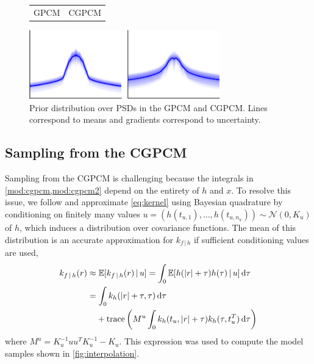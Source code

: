 \documentclass{article}
\newcommand{\id}[1]{\, \mathrm{d} #1}     %
\newcommand{\cond}{\, | \,}               %
\newcommand{\phan}[1]{\hphantom{#1\;}}
\begin{document}
\begin{figure}[t]
    \centering
    \begin{tabularx}{\linewidth}{>{\centering}X>{\centering}X}
        GPCM & CGPCM
    \end{tabularx}
    \includegraphics[width=\linewidth, height=3cm]{resources/cropped/prior_psd.pdf}
    \caption{Prior distribution over PSDs in the GPCM and CGPCM. Lines correspond to means and gradients correspond to uncertainty.}
    \label{fig:prior_psd}
\end{figure}

\subsection{Sampling from the CGPCM}
Sampling from the CGPCM is challenging because the integrals in \cref{mod:cgpcm,mod:cgpcm2} depend on the entirety of $h$ and $x$. To resolve this issue, we follow \citet{Tobar:2015:Learning_Stationary} and approximate \cref{eq:kernel} using Bayesian quadrature \cite{Minka:2000:Quadrature_GP} by conditioning on finitely many values $u=(h(t_{u,1}),\ldots,h(t_{u,n_u}))\sim \mathcal{N}(0,K_u)$ of $h$, which induces a  distribution over covariance functions. The mean of this distribution is an accurate approximation for $k_{f\cond h}$ if sufficient conditioning values are used,
\begin{align*}
    k_{f\cond h}(r)
    &\approx \mathbb{E}[k_{f\cond h}(r)\cond u]
    = \int_{0} \mathbb{E}[h(|r| + \tau) h(\tau)\cond u] \id{\tau} \\
    &= \int_0 k_h(|r| + \tau, \tau) \id{\tau} \\
    &\phan{=}+ \mathrm{trace} \left( M^u \int_{0} k_h(t_u, |r|+ \tau)k_h(\tau, t_u^T) \id{\tau} \right)
\end{align*}
where $M^{u}=K_u^{-1}uu^T K_u^{-1}-K_u$. This expression was used to compute the model samples shown in \cref{fig:interpolation}. %
\end{document}
